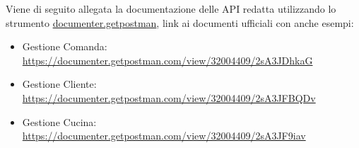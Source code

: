 Viene di seguito allegata la documentazione delle API redatta utilizzando lo strumento \href{https://www.postman.com/api-documentation-tool/}{documenter.getpostman}, link ai documenti ufficiali con anche esempi:
\begin{itemize}
    \item Gestione Comanda: \href{https://documenter.getpostman.com/view/32004409/2sA3JDhkaG}{https://documenter.getpostman.com/view/32004409/2sA3JDhkaG}
    \item Gestione Cliente: \href{https://documenter.getpostman.com/view/32004409/2sA3JFBQDv}{https://documenter.getpostman.com/view/32004409/2sA3JFBQDv}
    \item Gestione Cucina: \href{https://documenter.getpostman.com/view/32004409/2sA3JF9iav}{https://documenter.getpostman.com/view/32004409/2sA3JF9iav}
\end{itemize}








\clearpage